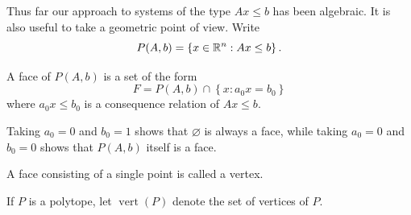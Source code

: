 Thus far our approach to systems of the type $Ax \le b$ has been algebraic. It is also useful to take a geometric point of view. Write
\[
	P(A,b) = \left\{x \in \mathbb{R}^n : Ax \le b\right\}
.\]

\begin{definition}[Face]
	A face of $P(A,b)$ is a set of the form
	\[
		F = P(A,b) \cap \left\{x : a_0 x = b_0\right\}
	\]
	where $a_0 x \le b_0$ is a consequence relation of $Ax \le b$.
\end{definition}

Taking $a_0 = 0$ and $b_0 = 1$ shows that $\varnothing$ is always a face, while taking $a_0 = 0$ and $b_0 = 0$ shows that $P(A,b)$ itself is a face.

\begin{definition}[Vertex]
	A face consisting of a single point is called a vertex.
\end{definition}

If $P$ is a polytope, let $\operatorname{vert}(P)$ denote the set of vertices of $P$.

